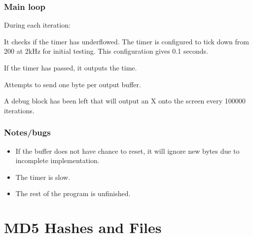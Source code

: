 \documentclass[letterpaper]{article}
\begin{document}
\subsubsection{Main loop%
  \label{main-loop}%
}

During each iteration:
\begin{list}{.}
{
\setlength{\rightmargin}{\leftmargin}
}

\item It checks if the timer has underflowed. The timer is configured to tick down from 200 at 2kHz for initial testing. This configuration gives 0.1 seconds.

\item If the timer has passed, it outputs the time.

\item Attempts to send one byte per output buffer.

\item A debug block has been left that will output an X onto the screen every 100000 iterations.
\end{list}


\subsubsection{Notes/bugs%
  \label{notes-bugs}%
}
%
\begin{itemize}

\item If the buffer does not have chance to reset, it will ignore new bytes due to incomplete implementation.

\item The timer is slow.

\item The rest of the program is unfinished.

\end{itemize}


\section{MD5 Hashes and Files%
  \label{md5-hashes-and-files}%
}
\end{document}
